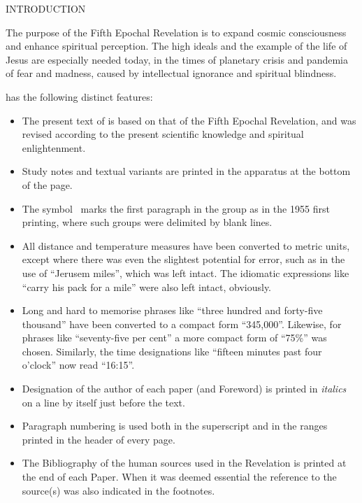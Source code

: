 \newpage
\thispagestyle{empty}
\makeatletter
{}%
\makeatother

\begin{center}\bibpapertitlefont INTRODUCTION\end{center}
\introfontsize

The purpose of the Fifth Epochal Revelation is
to expand cosmic consciousness and enhance spiritual perception.
The high ideals and the example of the life of Jesus are especially needed today,
in the times of planetary crisis and pandemia of fear and madness,
caused by intellectual ignorance and spiritual blindness.

 has the following distinct features:

\begin{itemize}
\item The present text of  is based on that of the Fifth Epochal Revelation,
and was revised according to the present scientific knowledge and spiritual enlightenment.
\item Study notes and textual variants are printed in the apparatus at the bottom of the page.
\item The symbol \pc\ marks the first paragraph in the group as in the 1955 first printing, where such groups were delimited by blank lines.
\item All distance and temperature measures have been converted to metric units, except where there was even the slightest potential for error, such as in the use of ``Jerusem miles'', which was left intact. The idiomatic expressions like ``carry his pack for a mile'' were also left intact, obviously.
\item Long and hard to memorise phrases like ``three hundred and forty\hyp{}five thousand'' have been converted to a compact form ``345,000''. Likewise, for phrases like ``seventy\hyp{}five per cent'' a more compact form of ``75\%'' was chosen. Similarly, the time designations like ``fifteen minutes past four o’clock'' now read ``16:15''.
\item Designation of the author of each paper (and Foreword) is printed in \textit{italics} on a line by itself just before the text.
\item Paragraph numbering is used both in the superscript and in the ranges printed in the head\-er of every page.
\item The Bibliography of the human sources used in the Revelation is printed at the end of each Paper.
      When it was deemed essential the reference to the source(s) was also indicated in the footnotes.
\end{itemize}

